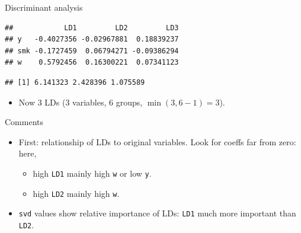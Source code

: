 \documentclass[ignorenonframetext,]{beamer}
\newenvironment{Shaded}{\begin{snugshade}}{\end{snugshade}}
\newcommand{\DataTypeTok}[1]{\textcolor[rgb]{0.13,0.29,0.53}{#1}}
\newcommand{\FloatTok}[1]{\textcolor[rgb]{0.00,0.00,0.81}{#1}}
\newcommand{\KeywordTok}[1]{\textcolor[rgb]{0.13,0.29,0.53}{\textbf{#1}}}
\newcommand{\NormalTok}[1]{#1}
\newcommand{\OperatorTok}[1]{\textcolor[rgb]{0.81,0.36,0.00}{\textbf{#1}}}
\newcommand{\StringTok}[1]{\textcolor[rgb]{0.31,0.60,0.02}{#1}}
\providecommand{\tightlist}{%
  \setlength{\itemsep}{0pt}\setlength{\parskip}{0pt}}
\begin{document}
\begin{frame}[fragile]{Discriminant analysis}
\protect\hypertarget{discriminant-analysis-2}{}

\small

\begin{Shaded}
\end{Shaded}

\begin{verbatim}
##            LD1         LD2         LD3
## y   -0.4027356 -0.02967881  0.18839237
## smk -0.1727459  0.06794271 -0.09386294
## w    0.5792456  0.16300221  0.07341123
\end{verbatim}

\begin{Shaded}
\end{Shaded}

\begin{verbatim}
## [1] 6.141323 2.428396 1.075589
\end{verbatim}

\normalsize

\begin{itemize}
\tightlist
\item
  Now 3 LDs (3 variables, 6 groups, \(\min(3,6-1)=3\)).
\end{itemize}

\end{frame}

\begin{frame}[fragile]{Comments}
\protect\hypertarget{comments-23}{}

\begin{itemize}
\item
  First: relationship of LDs to original variables. Look for coeffs far
  from zero: here,

  \begin{itemize}
  \item
    high \texttt{LD1} mainly high \texttt{w} or low \texttt{y}.
  \item
    high \texttt{LD2} mainly high \texttt{w}.
  \end{itemize}
\item
  \texttt{svd} values show relative importance of LDs: \texttt{LD1} much
  more important than \texttt{LD2}.
\end{itemize}

\end{frame}
\end{document}
